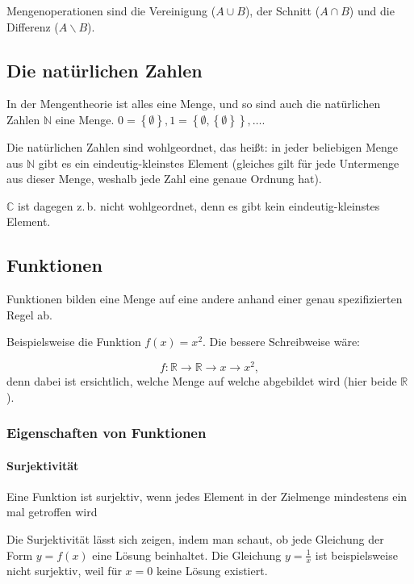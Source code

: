 \documentclass{scrartcl}
\begin{document}
Mengenoperationen sind die Vereinigung ($A \cup B$), der Schnitt ($A \cap B$) und die Differenz ($A \backslash B$).

\subsection{Die natürlichen Zahlen}

In der Mengentheorie ist alles eine Menge, und so sind auch die natürlichen Zahlen $\mathbb{N}$ eine Menge.
$0 = \left\{\emptyset\right\}, 1 = \left\{\emptyset, \left\{\emptyset\right\}\right\}, \dots$.

Die natürlichen Zahlen sind wohlgeordnet, das heißt: in jeder beliebigen Menge aus $\mathbb{N}$ gibt es ein
eindeutig-kleinstes Element (gleiches gilt für jede Untermenge aus dieser Menge, weshalb jede Zahl eine
genaue Ordnung hat).

$\mathbb{C}$ ist dagegen z.\,b. nicht wohlgeordnet, denn es gibt kein eindeutig-kleinstes Element.

\subsection{Funktionen}

Funktionen bilden eine Menge auf eine andere anhand einer genau spezifizierten Regel ab.

Beispielsweise die Funktion $f(x) = x^2$. Die bessere Schreibweise wäre:

\begin{equation}
	f: \mathbb{R} \rightarrow \mathbb{R} \longrightarrow x \rightarrow x^2,
\end{equation}
denn dabei ist ersichtlich, welche Menge auf welche abgebildet wird (hier beide $\mathbb{R}$).

\subsubsection{Eigenschaften von Funktionen}



\paragraph{Surjektivität}

Eine Funktion ist surjektiv, wenn jedes Element in der Zielmenge mindestens ein mal getroffen wird

Die Surjektivität lässt sich zeigen, indem man schaut, ob jede
Gleichung der Form $y = f(x)$ eine Lösung beinhaltet. Die Gleichung
$y = \frac{1}{x}$ ist beispielsweise nicht surjektiv, weil für 
$x = 0$ keine Lösung existiert.
\end{document}
